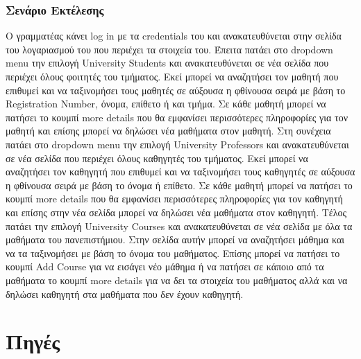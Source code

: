 \documentclass[12pt]{article}
\begin{document}
	\subsubsection{Σενάριο Εκτέλεσης}
	Ο γραμματέας κάνει log in με τα credentials του και ανακατευθύνεται στην σελίδα του λογαριασμού του που περιέχει τα στοιχεία του. Έπειτα πατάει στο dropdown menu την επιλογή University Students και ανακατευθύνεται σε νέα σελίδα που περιέχει όλους φοιτητές του τμήματος. Εκεί μπορεί να αναζητήσει τον μαθητή που επιθυμεί και να ταξινομήσει τους μαθητές σε αύξουσα η φθίνουσα σειρά με βάση το Registration Number, όνομα, επίθετο ή και τμήμα. Σε κάθε μαθητή μπορεί να πατήσει το κουμπί more details που θα εμφανίσει περισσότερες πληροφορίες  για τον μαθητή και επίσης μπορεί να δηλώσει νέα μαθήματα στον μαθητή. Στη συνέχεια πατάει στο dropdown menu την επιλογή University Professors και ανακατευθύνεται σε νέα σελίδα που περιέχει όλους καθηγητές του τμήματος. Εκεί μπορεί να αναζητήσει τον καθηγητή που επιθυμεί και να ταξινομήσει τους καθηγητές σε αύξουσα η φθίνουσα σειρά με βάση το  όνομα ή  επίθετο. Σε κάθε μαθητή μπορεί να πατήσει το κουμπί more details που θα εμφανίσει περισσότερες πληροφορίες  για τον καθηγητή και επίσης στην νέα σελίδα μπορεί να δηλώσει νέα μαθήματα στον καθηγητή. Τέλος πατάει την επιλογή University Courses και ανακατευθύνεται σε νέα σελίδα με όλα τα μαθήματα του πανεπιστήμιου. Στην σελίδα αυτήν μπορεί να αναζητήσει μάθημα και να τα ταξινομήσει με βάση το όνομα του μαθήματος. Επίσης μπορεί να πατήσει το κουμπί Add Course για να εισάγει νέο μάθημα ή να πατήσει σε κάποιο από τα μαθήματα το κουμπί more details για να δει τα στοιχεία του μαθήματος αλλά και να δηλώσει καθηγητή στα μαθήματα που δεν έχουν καθηγητή.
	
	
	
	

	\section{Πηγές}
	
\end{document}
